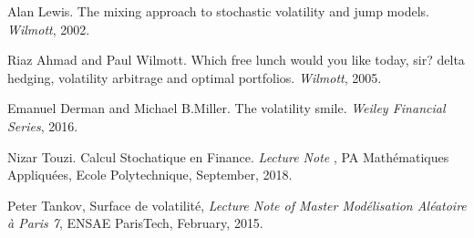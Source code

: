 \documentclass[10pt]{article}
\theoremstyle{plain}
\numberwithin{equation}{section}
\numberwithin{table}{section}
\begin{document}
\begin{thebibliography}{99}

 Alan Lewis. The mixing approach to stochastic volatility and jump models. {\it
Wilmott}, 2002.

 Riaz Ahmad and Paul Wilmott. Which free lunch would you like today, sir? delta hedging, volatility arbitrage and optimal portfolios. {\it
Wilmott}, 2005.
    
 Emanuel Derman and Michael B.Miller. The volatility smile. {\it
Weiley Financial Series}, 2016.

 Nizar Touzi. Calcul Stochatique en Finance. {\it
Lecture Note} {\bf}, PA Math\'ematiques Appliqu\'ees, Ecole Polytechnique, September, 2018.

 Peter Tankov, Surface de volatilit\'e, {\it
Lecture Note of Master Mod\'elisation Al\'eatoire \`a Paris 7}, ENSAE ParisTech, February, 2015.

\end{thebibliography}
\end{document}
